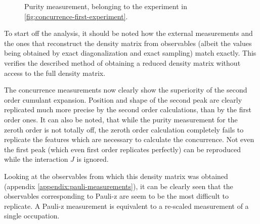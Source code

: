 \begin{figure}[htbp]
    \centering
    \vspace{-0.3cm}
    \caption{
            Purity measurement, belonging to the experiment in \autoref{fig:concurrence-first-experiment}.
        }
    \label{fig:purity-first-experiment}
\end{figure}

To start off the analysis, it should be noted how the external measurements and the ones that reconstruct the density matrix from observables (albeit the values being obtained by exact diagonalization and exact sampling) match exactly.
This verifies the described method of obtaining a reduced density matrix without access to the full density matrix.

The concurrence measurements now clearly show the superiority of the second order cumulant expansion.
Position and shape of the second peak are clearly replicated much more precise by the second order calculations, than by the first order ones.
It can also be noted, that while the purity measurement for the zeroth order is not totally off, the zeroth order calculation completely fails to replicate the features which are necessary to calculate the concurrence.
Not even the first peak (which even first order replicates perfectly) can be reproduced while the interaction $J$ is ignored.

Looking at the observables from which this density matrix was obtained (appendix \ref{appendix:pauli-measurements}), it can be clearly seen that the observables corresponding to Pauli-z are seem to be the most difficult to replicate.
A Pauli-z measurement is equivalent to a re-scaled measurement of a single occupation.
